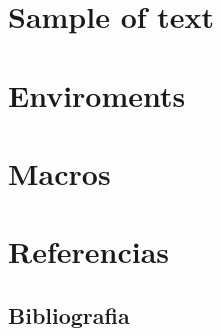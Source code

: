 \documentclass[12pt]{extbook} %
\def \SourceRootPath{.}
\begin{document}
\part{Sample of text}



\part{Enviroments}




\part{Macros}







\part{Referencias}

\chapter*{Bibliografia}
\printbibliography[heading=bibempty]

\cleardoublepage
{}
\setlength{\columnsep}{0.75cm}
\printindex



\end{document}
